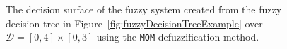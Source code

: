 \begin{multicols}{2}
    \begin{figure}[H]
        \caption[Decision surface of the fuzzy rules using \texttt{MOM} method]{The decision surface of the fuzzy system created from the fuzzy decision tree in Figure~\ref{fig:fuzzyDecisionTreeExample} over $\mathcal{D}=[0,4]\times[0,3]$ using the \texttt{MOM} defuzzification method.}
        \label{fig:fuzzyDecisionSurfaceExampleMOM}
    \end{figure}
\end{multicols}